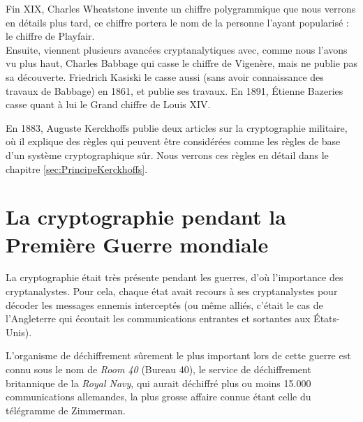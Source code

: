 Fin XIX\ieme, Charles Wheatstone invente un chiffre
polygrammique que nous verrons en détails plus tard, ce chiffre
portera le nom de la personne l'ayant popularisé : le chiffre
  de Playfair. \\

Ensuite, viennent plusieurs avancées cryptanalytiques avec, comme nous
l'avons vu plus haut, Charles Babbage qui casse le chiffre de
Vigenère, mais ne publie pas sa découverte. Friedrich Kasiski
le casse aussi (sans avoir connaissance des travaux de
Babbage) en 1861, et publie ses travaux. En 1891, Étienne
  Bazeries casse quant à lui le Grand chiffre de Louis XIV. 

En 1883, Auguste Kerckhoffs publie deux articles sur la
cryptographie militaire, où il explique des règles qui peuvent être
considérées comme les règles de base d'un système cryptographique
sûr. Nous verrons ces règles en détail dans le chapitre
\ref{sec:PrincipeKerckhoffs}. \\

\section{La cryptographie pendant la Première Guerre mondiale}
La cryptographie était très présente pendant les guerres, d'où
l'importance des cryptanalystes. Pour cela, chaque état avait recours
à ses cryptanalystes pour décoder les messages ennemis interceptés (ou
même alliés, c'était le cas de l'Angleterre qui écoutait les
communications entrantes et sortantes aux États-Unis).

L'organisme de déchiffrement sûrement le plus important lors de cette guerre
est connu sous le nom de \emph{Room 40} (Bureau 40), le service de
déchiffrement britannique de la \emph{Royal Navy}, qui aurait déchiffré
plus ou moins 15.000 communications allemandes, la plus grosse affaire
connue étant celle du télégramme de Zimmerman.

